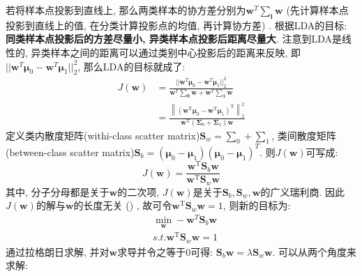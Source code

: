 若将样本点投影到直线上, 那么两类样本的协方差分别为$\boldsymbol{w}^T \boldsymbol{\sum_i} \boldsymbol{w}$ (先计算样本点投影到直线上的值, 在分类计算投影点的均值, 再计算协方差) . 根据LDA的目标: \textbf{同类样本点投影后的方差尽量小, 异类样本点投影后距离尽量大}. 注意到LDA是线性的, 异类样本之间的距离可以通过类别中心投影后的距离来反映, 即$||\boldsymbol{w}^T\boldsymbol{\mu}_0 - \boldsymbol{w}^T\boldsymbol{\mu}_1||_2^2$, 那么LDA的目标就成了: 
\begin{align}
	J(\boldsymbol{w}) &= \frac{||\boldsymbol{w}^T\boldsymbol{\mu}_0 - \boldsymbol{w}^T\boldsymbol{\mu}_1||_2^2}{\boldsymbol{w}^T \boldsymbol{\sum_0} \boldsymbol{w} + \boldsymbol{w}^T \boldsymbol{\sum_1} \boldsymbol{w}} \nonumber \\
	&= \frac{\left\|\left(\boldsymbol{w}^{\mathrm{T}} \boldsymbol{\mu}_{0}-\boldsymbol{w}^{\mathrm{T}} \boldsymbol{\mu}_{1}\right)^{\mathrm{T}}\right\|_{2}^{2}}{\boldsymbol{w}^{\mathrm{T}}\left(\boldsymbol{\Sigma}_{0}+\boldsymbol{\Sigma}_{1}\right) \boldsymbol{w}} \nonumber
\end{align}
定义类内散度矩阵(withi-class scatter matrix)$\boldsymbol{S}_w = \boldsymbol{\sum}_0 + \boldsymbol{\sum}_1$, 类间散度矩阵(between-class scatter matrix)$\boldsymbol{S}_b = (\boldsymbol{\mu}_0 - \boldsymbol{\mu}_1) (\boldsymbol{\mu}_0 - \boldsymbol{\mu}_1)^T$. 则$J(\boldsymbol{w})$可写成: 
$$
J(\boldsymbol{w}) = \frac{\boldsymbol{w}^{\mathrm{T}} \mathbf{S}_{b} \boldsymbol{w}}{\boldsymbol{w}^{\mathrm{T}} \mathbf{S}_{w} \boldsymbol{w}}
$$
其中, 分子分母都是关于$\boldsymbol{w}$的二次项, $J(\boldsymbol{w})$是关于$\boldsymbol{S}_b, \boldsymbol{S}_w, \boldsymbol{w}$的广义瑞利商. 因此$J(\boldsymbol{w})$的解与$\boldsymbol{w}$的长度无关 () , 故可令$\boldsymbol{w}^{\mathrm{T}} \mathbf{S}_{w} \boldsymbol{w} = 1$, 则新的目标为: 
\begin{align}
	& \mathop{min} \limits_{\boldsymbol{w}} -\boldsymbol{w}^T\boldsymbol{S}_b\boldsymbol{w} \nonumber\\
	& s.t. \boldsymbol{w}^{\mathrm{T}} \mathbf{S}_{w} \boldsymbol{w} = 1 \nonumber
\end{align}
通过拉格朗日求解, 并对$\boldsymbol{w}$求导并令之等于0可得: $\mathbf{S}_{b} \boldsymbol{w}=\lambda \mathbf{S}_{w} \boldsymbol{w}$. 可以从两个角度来求解: 

